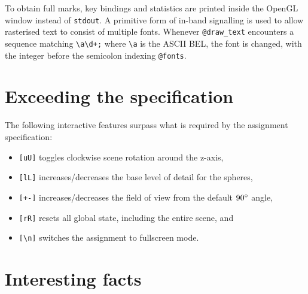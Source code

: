 \documentclass[a4paper,titlepage,12pt]{article}
\begin{document}
To obtain full marks, key bindings and statistics are printed inside the OpenGL
window instead of \texttt{stdout}. A primitive form of in-band signalling is
used to allow rasterised text to consist of multiple fonts. Whenever
\texttt{@draw\_text} encounters a sequence matching
\texttt{{\textbackslash}a{\textbackslash}d+;} where
\texttt{{\textbackslash}a} is the ASCII BEL, the font is changed, with the
integer before the semicolon indexing \texttt{@fonts}.

\newpage

\section{Exceeding the specification}

The following interactive features surpass what is required by the assignment
specification:

\begin{itemize}
	\item \texttt{[uU]} toggles clockwise scene rotation around the z-axis,
	\item \texttt{[lL]} increases/decreases the base level of detail for
	      the spheres,
	\item \texttt{[+-]} increases/decreases the field of view from the
	      default $90\degree$ angle,
	\item \texttt{[rR]} resets all global state, including the entire
	      scene, and
	\item \texttt{[{\textbackslash}n]} switches the assignment to
	      fullscreen mode.
\end{itemize}

\section{Interesting facts}
\end{document}

